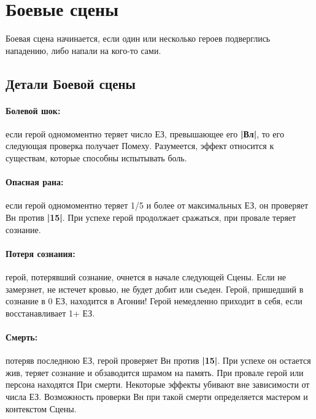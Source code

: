 \section{Боевые сцены}
Боевая сцена начинается, если один или несколько героев подверглись нападению, либо напали на кого-то сами.

\subsection{Детали Боевой сцены}
\paragraph{Болевой шок:} если герой одномоментно теряет число ЕЗ, превышающее его \textbf{|Вл|}, то его следующая проверка получает Помеху. 
Разумеется, эффект относится к существам, которые способны испытывать боль. 
\paragraph{Опасная рана:} если герой одномоментно теряет 1/5 и более от максимальных ЕЗ, он проверяет Вн против \textbf{|15|}. При успехе герой продолжает сражаться, при провале теряет сознание.
\paragraph{Потеря сознания:} герой, потерявший сознание, очнется в начале следующей Сцены. Если не замерзнет, не истечет кровью, не будет добит или съеден. Герой, пришедший в сознание в 0 ЕЗ, находится в Агонии!
\newline Герой немедленно приходит в себя, если восстанавливает 1+ ЕЗ.
\paragraph{Смерть:} потеряв последнюю ЕЗ, герой проверяет Вн против \textbf{|15|}. При успехе он остается жив, теряет сознание и обзаводится шрамом на память. При провале герой или персона находятся При смерти.
\newline Некоторые эффекты убивают вне зависимости от числа ЕЗ. Возможность проверки Вн при такой смерти определяется мастером и контекстом Сцены.
